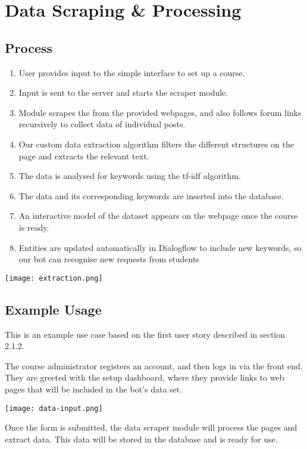 \section{Data Scraping \& Processing}
\subsection{Process}
\begin{enumerate}
    \item{User provides input to the simple interface to set up a course.}
    \item{Input is sent to the server and starts the scraper module.}
    \item{Module scrapes the  from the provided webpages, and also follows forum links recursively to collect data of individual posts.}
    \item{Our custom data extraction algorithm filters the different structures on the page and extracts the relevant text.}
    \item{The data is analysed for keywords using the tf-idf algorithm.}
    \item{The data and its corresponding keywords are inserted into the database.}
    \item{An interactive model of the dataset appears on the webpage once the course is ready.}
    \item{Entities are updated automatically in Dialogflow to include new keywords, so our bot can recognise new requests from students}
\end{enumerate}

\texttt{[image: extraction.png]}

\subsection{Example Usage}
This is an example use case based on the first user story described in section 2.1.2.

The course administrator registers an account, and then logs in via the front end. They are greeted with the setup dashboard, where they provide links to web pages that will be included in the bot's data set.

\texttt{[image: data-input.png]}

Once the form is submitted, the data scraper module will process the pages and extract data. This data will be stored in the database and is ready for use.

